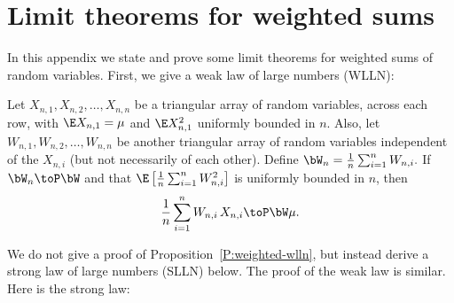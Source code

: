 \chapter{Limit theorems for weighted sums}\label{A:weighted-sums}

In this appendix we state and prove some limit theorems for weighted sums
of \iid random variables.  First, we give a weak law of large numbers (WLLN):

\begin{proposition}\label{P:weighted-wlln}
    Let $X_{n,1}, X_{n,2}, \ldots, X_{n,n}$ be a triangular array of random
    variables, \iid across each row, with $\E X_{n,1} = \mu$ and $\E 
    X_{n,1}^2$  uniformly bounded in $n$.  Also, let $W_{n,1}, W_{n,2}, \ldots, 
    W_{n,n}$ be another triangular array of random variables independent of 
    the $X_{n,i}$ (but not necessarily of each other).  Define 
    \(
        \bW_n = \frac{1}{n} \sum_{i=1}^n W_{n,i}.
    \) 
    If $\bW_n \toP \bW$ and that
    $\E \left[ \frac{1}{n} \sum_{i=1}^n W_{n,i}^2 \right]$ is uniformly 
    bounded in $n$, then
    \[
        \frac{1}{n} \sum_{i=1}^n W_{n,i} \, X_{n,i} \toP \bW \mu.
    \]
\end{proposition}

We do not give a proof of Proposition~\ref{P:weighted-wlln}, but instead derive a strong law of large numbers (SLLN) below.  The proof of the weak law is similar.  Here is the strong law:

